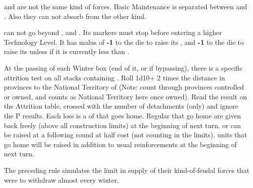 \bparag \Janissaire and \Timar are not the same kind of forces.  Basic
Maintenance is separated between \Janissaire and \Timar.  Also they can not
absorb \LD from the other kind.

\label{chSpecific:Turkey:Army Tech}
\TUR can not go beyond  \TMUS, and  \TBAT. Its markers must stop before entering a higher Technology
Level.  It has malus of {\bf -1} to the die to raise its , and {\bf -1} to the die to raise its 
unless if it is currently less than \TARQ.




\label{chSpecific:Turkey:Yearly Campaigning}
At the passing of each Winter box (end of it, or if bypassing), there
is a specific attrition test on all stacks containing \Timar.
\bparag Roll 1d10+ 2 times the distance in provinces to the National
Territory of \TUR (Note: count through provinces controlled or owned,
 and  counts as National Territory here once
owned).
\bparag Read the result on the Attrition table, crossed with the number
of \Timar detachments (only) and ignore the P results.
\bparag Each loss is a \LD of \Timar that goes home.  Regular \Timar \LD
that go home are given back freely (above all construction limits) at
the beginning of next turn, or can be raised at a following round at
half cost (not counting in the limits).  \Pasha units that go home will
be raised in addition to usual reinforcements at the beginning of next
turn.


\begin{designnote}
  The preceding rule simulates the limit in supply of their
  kind-of-feudal forces that were to withdraw almost every winter.
\end{designnote}


